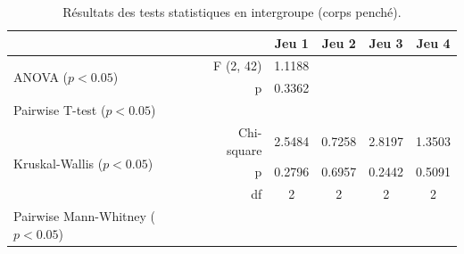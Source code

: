\begin{table}[]
    \begin{tabular}{lr|cccc}
        &  & Jeu 1 & Jeu 2 & Jeu 3 & Jeu 4 \\ \hline
       \multirow{2}{*}{ANOVA ($p < 0.05$)} & F (2, 42) & 1.1188 &  &  &  \\
        & p & 0.3362 &  &  &  \\ \hline
       \multirow{3}{*}{Pairwise T-test ($p < 0.05$)} &  &  &  &  &  \\
        &  &  &  &  &  \\
        &  &  &  &  &  \\ \hline
       \multirow{3}{*}{Kruskal-Wallis ($p < 0.05$)} & Chi-square & 2.5484 & 0.7258 & 2.8197 & 1.3503 \\
        & p & 0.2796 & 0.6957 & 0.2442 & 0.5091 \\
        & df & 2 & 2 & 2 & 2 \\ \hline
       \multirow{3}{*}{Pairwise Mann-Whitney ($p < 0.05$)} &  &  &  &  &  \\
        &  &  &  &  &  \\
        &  &  &  &  &
    \end{tabular}
\caption{Résultats des tests statistiques en intergroupe (corps penché).}
\label{tab:leaning_inter}
\end{table}

